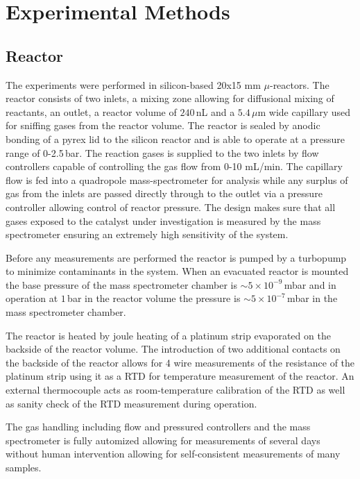 \documentclass[8.5pt,twoside,twocolumn]{article}
\begin{document}
\section{Experimental Methods}
\subsection{Reactor}
The experiments were performed in silicon-based 20x15 mm $\mu$-reactors\cite{Henriksen2009}. The reactor consists of two inlets, a mixing zone allowing for diffusional mixing of reactants, an outlet, a reactor volume of $240\,$nL and a $5.4\,\mu$m wide capillary used for sniffing gases from the reactor volume. The reactor is sealed by anodic bonding of a pyrex lid to the silicon reactor and is able to operate at a pressure range of 0-2.5\,bar. The reaction gases is supplied to the two inlets by flow controllers capable of controlling the gas flow from 0-10 mL/min. The capillary flow is fed into a quadropole mass-spectrometer for analysis while any surplus of gas from the inlets are passed directly through to the outlet via a pressure controller allowing control of reactor pressure. The design makes sure that all gases exposed to the catalyst under investigation is measured by the mass spectrometer ensuring an extremely high sensitivity of the system. 

Before any measurements are performed the reactor is pumped by a turbopump to minimize contaminants in the system. When an evacuated reactor is mounted the base pressure of the mass spectrometer chamber is $\sim5\times10^{-9}\,$mbar and in operation at $1\,$bar in the reactor volume the pressure is $\sim5\times10^{-7}\,$mbar in the mass spectrometer chamber. 

The reactor is heated by joule heating of a platinum strip evaporated on the backside of the reactor volume. The introduction of two additional contacts on the backside of the reactor allows for 4 wire measurements of the resistance of the platinum strip using it as a RTD for temperature measurement of the reactor. An external thermocouple acts as room-temperature calibration of the RTD as well as sanity check of the RTD measurement during operation.

The gas handling including flow and pressured controllers and the mass spectrometer is fully automized allowing for measurements of several days without human intervention allowing for self-consistent measurements of many samples.
\end{document}
